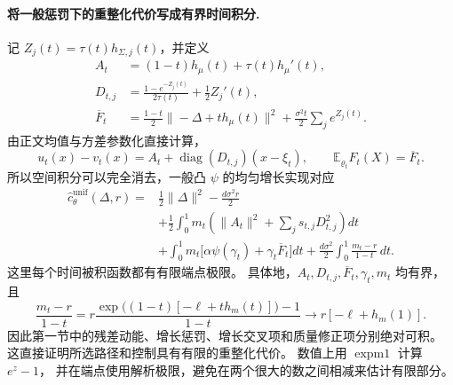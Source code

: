 \documentclass[UTF8,a4paper,11pt,fontset=fandol]{ctexart}
\begin{document}
\paragraph{将一般惩罚下的重整化代价写成有界时间积分.}
记 $Z_j(t)=\tau(t)h_{\Sigma,j}(t)$，并定义
\begin{equation}
\begin{aligned}
A_t&=(1-t)h_\mu(t)+\tau(t)h_\mu'(t),\\
D_{t,j}&=\frac{1-e^{-Z_j(t)}}{2\tau(t)}+\frac12Z_j'(t),\\
\overline F_t
&=\frac{1-t}{2}\|-\Delta+t h_\mu(t)\|^2
+\frac{\sigma^2t}{2}\sum_j e^{Z_j(t)}.
\end{aligned}
\label{eq:stable-gaussian-residuals}
\end{equation}
由正文均值与方差参数化直接计算，
\begin{equation}
u_t(x)-v_t(x)=A_t+\operatorname{diag}(D_{t,j})(x-\xi_t),
\qquad
\mathbb E_{\varrho_t}F_t(X)=\overline F_t.
\end{equation}
所以空间积分可以完全消去，一般凸 $\psi$ 的均匀增长实现对应
\begin{equation}
\boxed{
\begin{aligned}
\widehat c_\theta^{\mathrm{unif}}(\Delta,r)
={}&\frac12\|\Delta\|^2-\frac{d\sigma^2r}{2}\\
&+\frac12\int_0^1m_t
\left(\|A_t\|^2+\sum_js_{t,j}D_{t,j}^2\right)dt\\
&+\int_0^1m_t\bigl[\alpha\psi(\gamma_t)+\gamma_t\overline F_t\bigr]dt
+\frac{d\sigma^2}{2}\int_0^1\frac{m_t-r}{1-t}\,dt.
\end{aligned}
}
\label{eq:finite-gaussian-uniform-cost}
\end{equation}
这里每个时间被积函数都有有限端点极限。
具体地，$A_t,D_{t,j},\overline F_t,\gamma_t,m_t$ 均有界，且
\begin{equation}
\frac{m_t-r}{1-t}
=r\frac{\exp\!\bigl((1-t)[-\ell+t h_m(t)]\bigr)-1}{1-t}
\longrightarrow r[-\ell+h_m(1)].
\end{equation}
因此第一节中的残差动能、增长惩罚、增长交叉项和质量修正项分别绝对可积。
这直接证明所选路径和控制具有有限的重整化代价。
数值上用 $\operatorname{expm1}$ 计算 $e^z-1$，
并在端点使用解析极限，避免在两个很大的数之间相减来估计有限部分。
\end{document}

